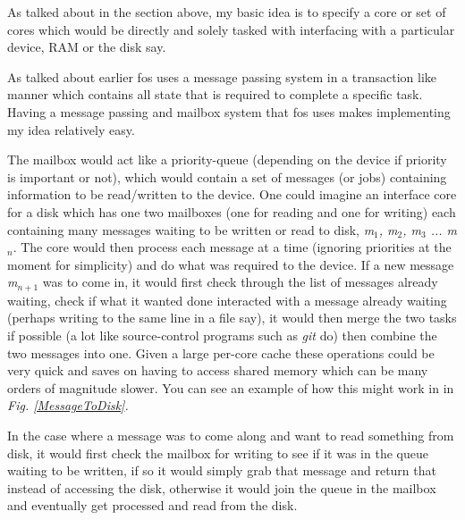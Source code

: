 \documentclass[journal]{IEEEtran}
\begin{document}
As talked about in the section above, my basic idea is to specify a core or set of cores which would be directly and solely tasked with interfacing with a particular device, RAM or the disk say. 

As talked about earlier fos uses a message passing system in a transaction like manner which contains all state that is required to complete a specific task. Having a message passing and mailbox system that fos uses makes implementing my idea relatively easy.

The mailbox would act like a priority-queue (depending on the device if priority is important or not), which would contain a set of messages (or jobs) containing information to be read/written to the device. One could imagine an interface core for a disk which has one two mailboxes (one for reading and one for writing) each containing many messages waiting to be written or read to disk, \emph{m$_{1}$, m$_{2}$, m$_{3}$ ... m$_{n}$}. The core would then process each message at a time (ignoring priorities at the moment for simplicity) and do what was required to the device. If a new message \emph{m$_{n+1}$} was to come in, it would first check through the list of messages already waiting, check if what it wanted done interacted with a message already waiting (perhaps writing to the same line in a file say), it would then merge the two tasks if possible (a lot like source-control programs such as \emph{git} do) then combine the two messages into one. Given a large per-core cache these operations could be very quick and saves on having to access shared memory which can be many orders of magnitude slower. You can see an example of how this might work in in \emph{Fig. \ref{MessageToDisk}.}

In the case where a message was to come along and want to read something from disk, it would first check the mailbox for writing to see if it was in the queue waiting to be written, if so it would simply grab that message and return that instead of accessing the disk, otherwise it would join the queue in the mailbox and eventually get processed and read from the disk.
\end{document}
